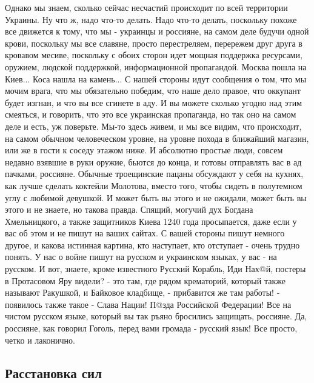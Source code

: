 Однако мы знаем, сколько сейчас несчастий происходит по всей территории
Украины. Ну что ж, надо что-то делать. Надо что-то делать, поскольку похоже все
движется к тому, что мы - украинцы и россияне, на самом деле будучи одной
крови, поскольку мы все славяне, просто перестреляем, перережем друг друга в
кровавом месиве, поскольку с обоих сторон идет мощная поддержка ресурсами,
оружием, людской поддержкой, информационной пропагандой. Москва пошла на
Киев... Коса нашла на камень... С нашей стороны идут сообщения о том, что мы
мочим врага, что мы обязательно победим, что наше дело правое, что оккупант
будет изгнан, и что вы все сгинете в аду. И вы можете сколько угодно над этим
смеяться, и говорить, что это все украинская пропаганда, но так оно на самом
деле и есть, уж поверьте.  Мы-то здесь живем, и мы все видим, что происходит,
на самом обычном человеческом уровне, на уровне похода в ближайший магазин, или
же в гости к соседу этажом ниже. И абсолютно простые люди, совсем недавно
взявшие в руки оружие, бьются до конца, и готовы отправлять вас в ад пачками,
россияне.  Обычные троещинские пацаны обсуждают у себя на кухнях, как лучше
сделать коктейли Молотова, вместо того, чтобы сидеть в полутемном углу с
любимой девушкой. И может быть вы этого и не ожидали, может быть вы этого и не
знаете, но такова правда.  Спящий, могучий дух Богдана Хмельницкого, а также
защитников Киева 1240 года просыпается, даже если у вас об этом и не пишут на
ваших сайтах. С вашей стороны пишут немного другое, и какова истинная картина,
кто наступает, кто отступает - очень трудно понять.  У нас о войне пишут на
русском и украинском языках, у вас - на русском. И вот, знаете, кроме
известного Русский Корабль, Иди Нах@й, постеры в Протасовом Яру видели? - это
там, где рядом крематорий, который также называют Ракушкой, и Байковое
кладбище, - прибавится же там работы! - появилось также такое - Слава Нации!
П@зда Российской Федерации! Все на чистом русском языке, который вы так ръяно
бросились защищать, россияне. Да, россияне, как говорил Гоголь, перед вами
громада - русский язык!  Все просто, четко и лаконично.

\subsection{Расстановка сил}

